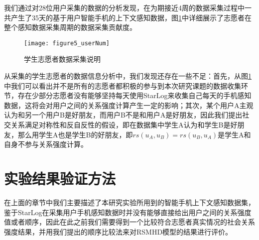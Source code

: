 \par 我们通过对28位用户采集的数据的分析发现，在为期接近4周的数据采集过程中一共产生了35天的基于用户智能手机的上下文感知数据，图\ref{fig:userNum}中详细展示了志愿者在整个感知数据采集周期的数据采集贡献度。
\begin{figure}[htb]
\centering
\texttt{[image: figure5\_userNum]}
\caption{学生志愿者数据采集说明}
\label{fig:userNum}
\end{figure}
\par 从采集的学生志愿者的数据信息分析中，我们发现还存在一些不足：首先，从图\ref{fig:userNum}中我们可以看出并不是所有的志愿者都积极的参与到本次研究课题的数据收集环节，存在少部分志愿者没有能够坚持每天使用StarLog来收集自己每天的手机感知数据，这将会对用户之间的关系强度计算产生一定的影响；其次，某个用户A主观认为和另一个用户B是好朋友，而用户B不是和用户A是好朋友，因此我们提出社交关系满足对称性和反自反性的假设，即在数据集中学生A认为和学生B是好朋友，那么用学生A也是学生B的好朋友，即$rs(u_{A},u_{B})=rs(u_{B},u_{A})$是学生A和自身不参与关系强度计算。

\section{实验结果验证方法}
\label{sec:section5-2}
在上面的章节中我们主要描述了本研究实验所用到的智能手机上下文感知数据集，鉴于StarLog在采集用户手机感知数据时并没有能够直接给出用户之间的关系强度值或者顺序，因此在此之前我们需要得到一个比较符合志愿者真实情况的社会关系强度结果，并用我们提出的顺序比较法来对RSMHD模型的结果进行评价。
